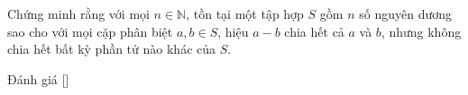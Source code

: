 \ifshowproblem
\begin{problem}\label{problem:USA-2015-TST-P2}
    Chứng minh rằng với mọi \( n \in \mathbb{N} \), tồn tại một tập hợp \( S \) gồm \( n \) số nguyên dương
    sao cho với mọi cặp phân biệt \( a, b \in S \), hiệu \( a - b \) chia hết cả \( a \) và \( b \),
    nhưng không chia hết bất kỳ phần tử nào khác của \( S \).
\end{problem}
\fi

\ifshowinfo
Đánh giá [\textbf{}]\footnotemark
{}
\fi
